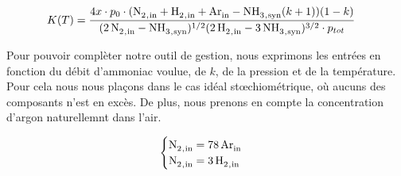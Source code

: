 \begin{align}
	K(T) & = \frac{4x\cdot p_0\cdot (\ce{N2_{,in} + H2_{,in} + Ar_{in}} - 
	\ce{NH3_{,syn}}(k + 1)) (1 - k)}{(\ce{2N2_{,in} - NH3_{,syn}})^{1/2} (\ce{2H2_{,in} - 3NH3_{,syn}})^{3/2} \cdot p_{tot}}
	\label{eq:finale}
\end{align}

Pour pouvoir complèter notre outil de gestion, nous exprimons les entrées 
en fonction du débit d'ammoniac voulue, de $k$, de la pression et de la
température. Pour cela nous nous plaçons dans le cas idéal stœchiométrique,
où aucuns des composants n'est en excès. De plus, nous prenons en compte la 
concentration d'argon naturellemnt dans l'air. 
 
$$
\begin{cases}
 \ce{N2_{,in}} = \ce{78Ar_{in}}\\ 
 \ce{N2_{,in}} = \ce{3H2_{,in}} \\
\end{cases}
$$

